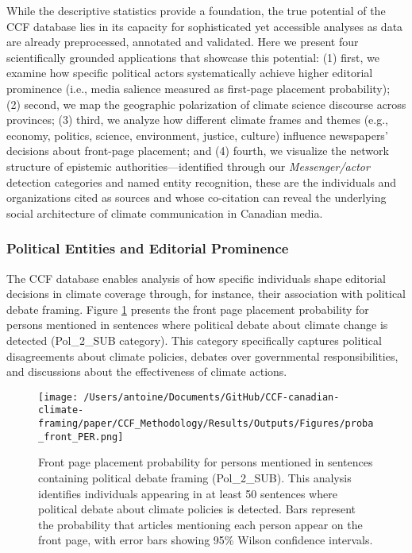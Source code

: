 \documentclass[12pt]{article}
\begin{document}
While the descriptive statistics provide a foundation, the true potential of the CCF database lies in its capacity for sophisticated yet accessible analyses as data are already preprocessed, annotated and validated. Here we present four scientifically grounded applications that showcase this potential: (1) first, we examine how specific political actors systematically achieve higher editorial prominence (i.e., media salience measured as first-page placement probability); (2) second, we map the geographic polarization of climate science discourse across provinces; (3) third, we analyze how different climate frames and themes (e.g., economy, politics, science, environment, justice, culture) influence newspapers' decisions about front-page placement; and (4) fourth, we visualize the network structure of epistemic authorities—identified through our \emph{Messenger/actor} detection categories and named entity recognition, these are the individuals and organizations cited as sources and whose co-citation can reveal the underlying social architecture of climate communication in Canadian media.


\subsubsection{Political Entities and Editorial Prominence}

The CCF database enables analysis of how specific individuals shape editorial decisions in climate coverage through, for instance, their association with political debate framing. Figure \ref{fig:political_entities} presents the front page placement probability for persons mentioned in sentences where political debate about climate change is detected (Pol\_2\_SUB category). This category specifically captures political disagreements about climate policies, debates over governmental responsibilities, and discussions about the effectiveness of climate actions.

\begin{figure}[!h]
\vspace*{\fill}
\centering
\texttt{[image: /Users/antoine/Documents/GitHub/CCF-canadian-climate-framing/paper/CCF\_Methodology/Results/Outputs/Figures/proba\_front\_PER.png]}
\caption{Front page placement probability for persons mentioned in sentences containing political debate framing (Pol\_2\_SUB). This analysis identifies individuals appearing in at least 50 sentences where political debate about climate policies is detected. Bars represent the probability that articles mentioning each person appear on the front page, with error bars showing 95\% Wilson confidence intervals.}
\label{fig:political_entities}
\vspace*{0pt}
\end{figure}
\end{document}
